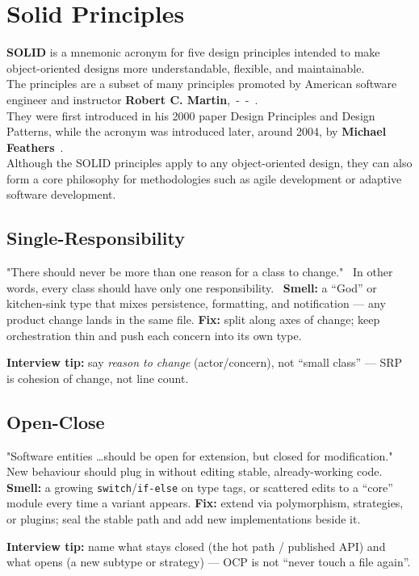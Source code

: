 \chapter{Solid Principles}
\label{chap:solidprinciples}

\textbf{SOLID} is a mnemonic acronym for five design principles intended 
to make object-oriented designs more understandable, flexible, and maintainable.\\
The principles are a subset of many principles promoted by 
American software engineer and instructor 
\textbf{Robert C. Martin},~\cite{martin-poO}-~\cite{martin-SOLIDstart}-~\cite{metz-sood}. \\
They were first introduced in his 2000 paper Design Principles and Design Patterns, 
while the acronym was introduced later, around 2004, 
by \textbf{Michael Feathers}~\cite{feathers-clean-architecture}. \\
Although the SOLID principles apply to any object-oriented design, 
they can also form a core philosophy for methodologies such as 
agile development or adaptive software development.

\newpage
\section{Single-Responsibility}
\label{sec:srp}
    "There should never be more than one reason for a class to change."~\cite{martin-srp}
    \newline
    In other words, every class should have only one responsibility.~\cite{martin-agileSoftDev}
    \newline
    \textbf{Smell:} a ``God'' or kitchen-sink type that mixes persistence, formatting, and notification --- any product change lands in the same file.
    \newline
    \textbf{Fix:} split along axes of change; keep orchestration thin and push each concern into its own type.
    \par\noindent\textbf{Interview tip:} say \emph{reason to change} (actor/concern), not ``small class'' --- SRP is cohesion of change, not line count.

\section{Open-Close}
\label{sec:ocp}
    "Software entities \ldots  should be open for extension, but closed for modification."~\cite{ocp}
    \newline
    New behaviour should plug in without editing stable, already-working code.
    \newline
    \textbf{Smell:} a growing \texttt{switch}/\texttt{if-else} on type tags, or scattered edits to a ``core'' module every time a variant appears.
    \newline
    \textbf{Fix:} extend via polymorphism, strategies, or plugins; seal the stable path and add new implementations beside it.
    \par\noindent\textbf{Interview tip:} name what stays closed (the hot path / published API) and what opens (a new subtype or strategy) --- OCP is not ``never touch a file again''.

